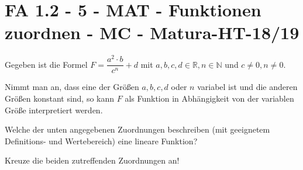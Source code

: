 \section{FA 1.2 - 5 - MAT - Funktionen zuordnen - MC - Matura-HT-18/19}

\begin{beispiel}[FA 1.2]{1}
Gegeben ist die Formel $F=\dfrac{a^2\cdot b}{c^n}+d$ mit $a,b,c,d \in \mathbb{R}, n\in \mathbb{N}$ und $c\neq 0, n\neq 0$.

Nimmt man an, dass eine der Größen $a,b,c,d$ oder $n$ variabel ist und die anderen Größen konstant sind, so kann $F$ als Funktion in Abhängigkeit von der variablen Größe interpretiert werden. \leer

Welche der unten angegebenen Zuordnungen beschreiben (mit geeignetem Definitions- und Wertebereich) eine lineare Funktion?

Kreuze die beiden zutreffenden Zuordnungen an!

\end{beispiel}